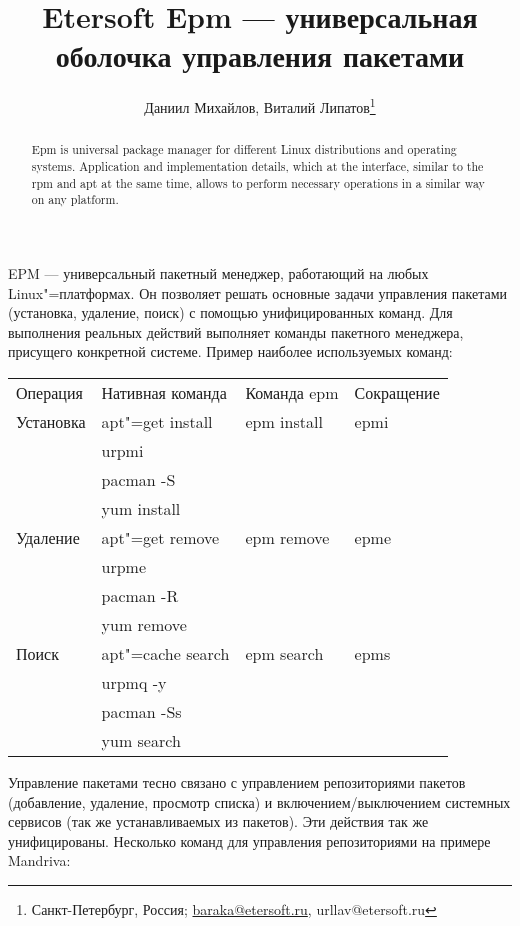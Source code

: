 \documentclass[10pt, a5paper]{article}
\begin{document}
\title{Etersoft Epm — универсальная оболочка управления пакетами}%

\author{Даниил Михайлов, Виталий Липатов\footnote{Санкт-Петербург, Россия; \url{baraka@etersoft.ru}, url{lav@etersoft.ru}}}
\maketitle

\begin{abstract}
Epm is universal package manager for different Linux distributions and operating systems. Application and implementation details, which at the interface, similar to the rpm and apt at the same time, allows to perform necessary operations in a similar way on any platform.
\end{abstract}

EPM — универсальный пакетный менеджер, работающий на любых Linux"=платформах. Он позволяет решать основные задачи управления пакетами (установка, удаление, поиск) с помощью унифицированных команд. Для выполнения реальных действий выполняет команды пакетного менеджера, присущего конкретной системе.
Пример наиболее используемых команд:

\begin{table}
  \centering
  \begin{tabular}{ l l l l }
    Операция   & Нативная команда  & Команда epm & Сокращение \\
    Установка  & apt"=get install  & epm install & epmi \\
    ~          & urpmi\\
    ~          & pacman -S\\
    ~          & yum install \\
    Удаление   & apt"=get remove   & epm remove  & epme \\
    ~          & urpme \\
    ~          & pacman -R \\
    ~          & yum remove \\
    Поиск      & apt"=cache search & epm search  & epms \\
    ~          & urpmq -y\\
    ~          & pacman -Ss \\
    ~          & yum search 
  \end{tabular}
\end{table}
Управление пакетами тесно связано с управлением репозиториями пакетов (добавление, удаление, просмотр списка) и включением/выключением системных сервисов (так же устанавливаемых из пакетов). Эти действия так же унифицированы. Несколько команд для управления репозиториями на примере Mandriva:
\end{document}
